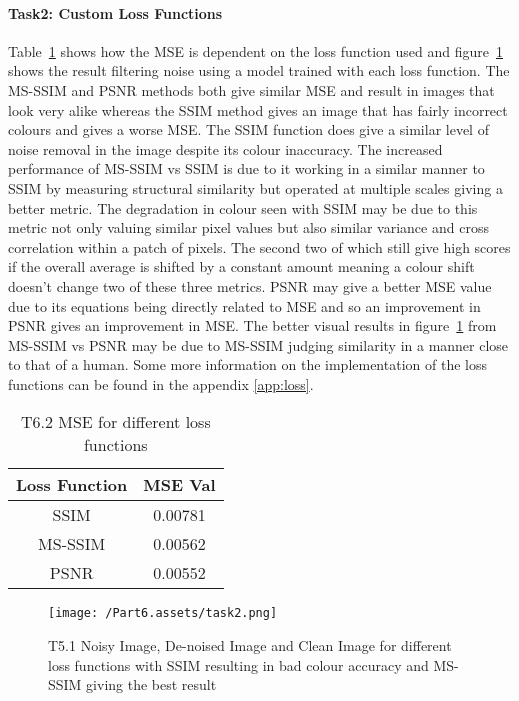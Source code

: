 \documentclass[10pt,twocolumn,letterpaper]{article}
\begin{document}
\paragraph{Task2: Custom Loss Functions}

Table~\ref{table:t62} shows how the MSE is dependent on the loss function used and figure~\ref*{fig:t62} shows the result filtering noise using a model trained with each loss function. The MS-SSIM and PSNR methods both give similar MSE and result in images that look very alike whereas the SSIM method gives an image that has fairly incorrect colours and gives a worse MSE. The SSIM function does give a similar level of noise removal in the image despite its colour inaccuracy. The increased performance of MS-SSIM vs SSIM is due to it working in a similar manner to SSIM by measuring structural similarity but operated at multiple scales giving a better metric\cite{ssim}. The degradation in colour seen with SSIM may be due to this metric not only valuing similar pixel values but also similar variance and cross correlation within a patch of pixels\cite{ssim}. The second two of which still give high scores if the overall average is shifted by a constant amount meaning a colour shift doesn't change two of these three metrics. PSNR may give a better MSE value due to its equations being directly related to MSE and so an improvement in PSNR gives an improvement in MSE\cite{psnr}. The better visual results in figure~\ref*{fig:t62} from MS-SSIM vs PSNR may be due to MS-SSIM judging similarity in a manner close to that of a human\cite{ssim}.
Some more information on the implementation of the loss functions can be found in the appendix \ref*{app:loss}.

\begin{table}[ht]
    \small
    \centering
    \begin{tabular}{|c|c|}
        \hline
        Loss Function & MSE Val \\
        \hline
        SSIM & 0.00781 \\
        MS-SSIM & 0.00562 \\
        PSNR & 0.00552 \\
        \hline
    \end{tabular}
    \medbreak
    \caption{T6.2 MSE for different loss functions}
    \label{table:t62}
    \vspace{-0.8cm}
\end{table}

\begin{figure}[ht]
    \begin{center}
        \texttt{[image: /Part6.assets/task2.png]}
        \caption{T5.1 Noisy Image, De-noised Image and Clean Image for different loss functions with SSIM resulting in bad colour accuracy and MS-SSIM giving the best result}\label{fig:t62}
        \vspace{-0.6cm}
    \end{center}
\end{figure}
\end{document}
